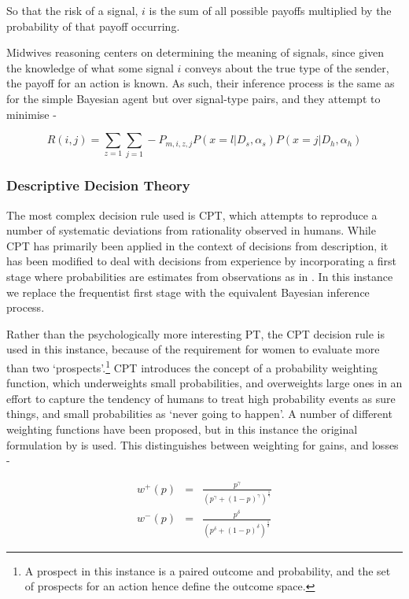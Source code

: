 So that the risk of a signal, \(i\) is the sum of all possible payoffs multiplied by the probability of that payoff occurring.

Midwives reasoning centers on determining the meaning of signals, since given the knowledge of what some signal \(i\) conveys about the true type of the sender, the payoff for an action is known. As such, their inference process is the same as for the simple Bayesian agent but over signal-type pairs, and they attempt to minimise -

\begin{equation}
R(i, j)= \sum_{z=1}\sum_{j=1}-P_{m, i, z, j}P(x=l|D_{s},\alpha_{s})P(x=j|D_{h},\alpha_{h})\label{eq:mw_risk}
\end{equation}

\subsubsection{Descriptive Decision Theory}

The most complex decision rule used is \ac{CPT}, which attempts to reproduce a number of systematic deviations from rationality observed in humans. While \ac{CPT} has primarily been applied in the context of decisions from description, it has been modified to deal with decisions from experience by incorporating a first stage where probabilities are estimates from observations as in \cite{FoxCPT}. In this instance we replace the frequentist first stage with the equivalent Bayesian inference process.

Rather than the psychologically more interesting \ac{PT}, the \ac{CPT}
decision rule is used in this instance, because of the requirement
for women to evaluate more than two `prospects'.\footnote{A prospect in this instance is a paired outcome and probability, and the set of prospects
for an action hence define the outcome space.} \ac{CPT} introduces
the concept of a probability weighting function, which underweights
small probabilities, and overweights large ones in an effort to capture
the tendency of humans to treat high probability events as sure things,
and small probabilities as `never going to happen'. A number of different
weighting functions have been proposed, but in this instance the original
formulation by \citet{Tversky1992} is used. This distinguishes between
weighting for gains, and losses -

\begin{eqnarray*}
w^{+}(p) & = & \frac{p^{\gamma}}{(p^{\gamma}+(1-p)^{\gamma})^{\frac{1}{\gamma}}}\\
w^{-}(p) & = & \frac{p^{\delta}}{(p^{\delta}+(1-p)^{\delta})^{\frac{1}{\delta}}}
\end{eqnarray*}


